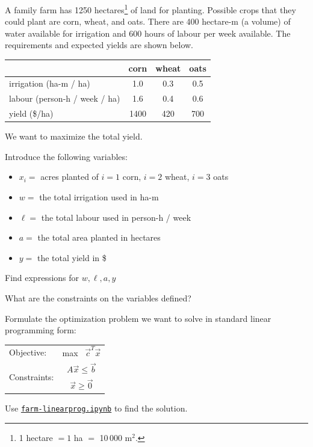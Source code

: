 \documentclass{workbook}
\begin{document}
\begin{slide}
\question

\begin{problem}
	A family farm has 1250 hectares\footnote{1 hectare $=1$ ha $=$ 10\,000 m$^2$.}  of land for planting. Possible crops that they could plant are corn, wheat, and oats. There are 400 hectare-m (a volume) of water available for irrigation and 600 hours of labour per week available. The requirements and expected yields are shown below.
	
	
	\begin{center}
	\small
	\begin{tabular}{l|c|c|c}
	& corn & wheat & oats \\ \hline
	irrigation (ha-m / ha) & 1.0 & 0.3 & 0.5 \\ \hline
	labour (person-h / week / ha) & 1.6 & 0.4 & 0.6 \\ \hline
	yield (\$/ha) & 1400 & 420 & 700 \\ %
	\end{tabular}
	\end{center}
	
	We want to maximize the total yield.
\end{problem}

Introduce the following variables:
\begin{itemize}
	\item $x_i= $ acres planted of $i=1$ corn, $i=2$ wheat, $i=3$ oats
	\item $w=$ the total irrigation used in ha-m
	\item $\ell=$ the total labour used in person-h / week
	\item $a=$ the total area planted in hectares
	\item $y=$ the total yield in \$
\end{itemize}

\begin{parts}
	\item Find expressions for $w, \ell, a, y$
	\item What are the constraints on the variables defined?	
	\item Formulate the optimization problem we want to solve in standard linear programming form:
	\begin{center}
		\begin{tabular}{lc}
		Objective: 		& max \ $\vec{c}^T \vec{x}$ \\
		\multirow{2}{*}{Constraints:} 	& $A \vec{x} \leq \vec{b}$ \\
						& $\vec{x} \geq \vec{0}$
		\end{tabular}
	\end{center}
	\item Use \href{https://utoronto.syzygy.ca/jupyter/user-redirect/git-pull?repo=https://github.com/bigfatbernie/IBLMathModeling&subPath=python/farm-linearprog.ipynb}{\tt farm-linearprog.ipynb} to find the solution.

\end{parts}

\end{slide}
\end{document}
